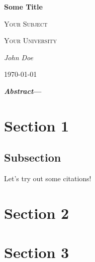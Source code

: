 \documentclass[letterpaper, 10pt, twocolumn]{article}
\begin{document}
\begin{titlepage}
 \centering
 {\Huge\textbf{Some Title}\par}
 \vspace{1cm}
 {\scshape\Large Your Subject\par}
 \vspace{1.5cm}
 {\scshape\LARGE Your University\par}
 \vspace{2cm}
 {\Large\textit{John Doe}\par}
 \vfill
 \vfill

 {\large \today\par}
\end{titlepage}


\textbf{\textit{Abstract}—\blindtext[1]}

\section{Section 1}
\blindtext[1]
\subsection{Subsection}
Let's try out some citations! \cite{einstein,latexcompanion,knuthwebsite}

\section{Section 2}
\blindtext[1]

\section{Section 3}
\blindtext[1]

\printbibliography

\tableofcontents
\end{document}
